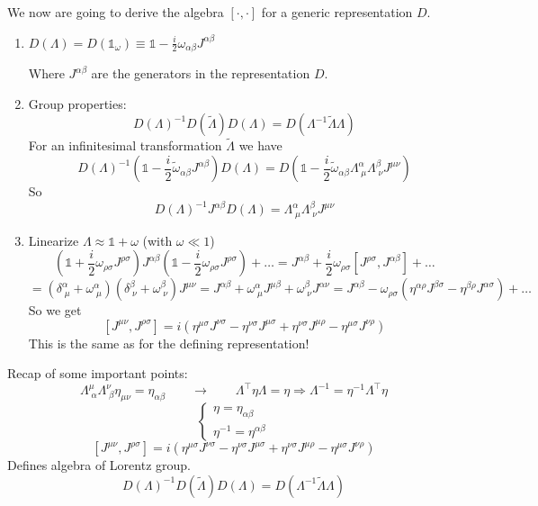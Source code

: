 We now are going to derive the algebra $[\cdot,\cdot]$ for a generic representation $D$.

\begin{enumerate}
\item $D(\Lambda) = D(\mathbb{1}_\omega) \equiv \mathbb{1} - \frac{i}{2}\omega_{\alpha\beta}J^{\alpha\beta}$

Where $J^{\alpha\beta}$ are the generators in the representation $D$.
\item Group properties:
\[ D(\Lambda)^{-1}D(\tilde{\Lambda})D(\Lambda) = D(\Lambda^{-1}\tilde{\Lambda}\Lambda) \]
For an infinitesimal transformation $\tilde{\Lambda}$ we have
\[ D(\Lambda)^{-1}(\mathbb{1}- \frac{i}{2}\tilde{\omega}_{\alpha\beta}J^{\alpha\beta})D(\Lambda) = D(\mathbb{1}- \frac{i}{2}\tilde{\omega}_{\alpha\beta}\Lambda^\alpha_{\;\mu}\Lambda^\beta_{\;\nu}J^{\mu\nu}) \]
So \[ \boxed{D(\Lambda)^{-1}J^{\alpha\beta}D(\Lambda) = \Lambda^\alpha_{\;\mu}\Lambda^\beta_{\;\nu}J^{\mu\nu}} \]
\item Linearize $\Lambda \approx \mathbb{1} + \omega$ (with $\omega \ll 1$)
\[ \left(\mathbb{1}+\frac{i}{2}\omega_{\rho\sigma}J^{\rho\sigma}\right)J^{\alpha\beta}\left(\mathbb{1}- \frac{i}{2}\omega_{\rho\sigma}J^{\rho\sigma}\right)+\ldots = J^{\alpha\beta}+\frac{i}{2}\omega_{\rho\sigma}\left[J^{\rho\sigma},J^{\alpha\beta}\right]+\ldots \]
\[ = \left(\delta^\alpha_{\;\mu}+ \omega^\alpha_{\;\mu}\right)\left(\delta^\beta_{\;\nu}+\omega^\beta_{\;\nu}\right)J^{\mu\nu} = J^{\alpha\beta}+\omega^\alpha_{\;\mu}J^{\mu\beta}+\omega^\beta_{\;\nu}J^{\alpha\nu} = J^{\alpha\beta}-\omega_{\rho\sigma}\left(\eta^{\alpha\rho}J^{\beta\sigma}-\eta^{\beta\rho}J^{\alpha\sigma}\right) + \ldots \]
So we get
\[ \left[J^{\mu\nu}, J^{\rho\sigma}\right]= i \left(\eta^{\mu\sigma}J^{\nu\sigma}-\eta^{\nu\sigma}J^{\mu\sigma}+\eta^{\nu\sigma}J^{\mu\rho}-\eta^{\mu\sigma}J^{\nu\rho}\right) \]
This is the same as for the defining representation!
\end{enumerate}

\begin{example}
Recap of some important points:
\[ \Lambda^\mu_{\;\alpha}\Lambda^\nu_{\;\beta}\eta_{\mu\nu} = \eta_{\alpha\beta} \qquad \to \qquad \Lambda^\intercal\eta\Lambda = \eta \Rightarrow \Lambda^{-1}=\eta^{-1}\Lambda^\intercal\eta \]
\[\begin{cases}
\eta = \eta_{\alpha\beta}\\
\eta^{-1} = \eta^{\alpha\beta}
\end{cases}\]
\[ \left[J^{\mu\nu}, J^{\rho\sigma}\right]= i \left(\eta^{\mu\sigma}J^{\nu\sigma}-\eta^{\nu\sigma}J^{\mu\sigma}+\eta^{\nu\sigma}J^{\mu\rho}-\eta^{\mu\sigma}J^{\nu\rho}\right) \]
Defines algebra of Lorentz group.
\[ D(\Lambda)^{-1}D(\tilde{\Lambda})D(\Lambda) = D(\Lambda^{-1}\tilde{\Lambda}\Lambda) \]
\end{example}

